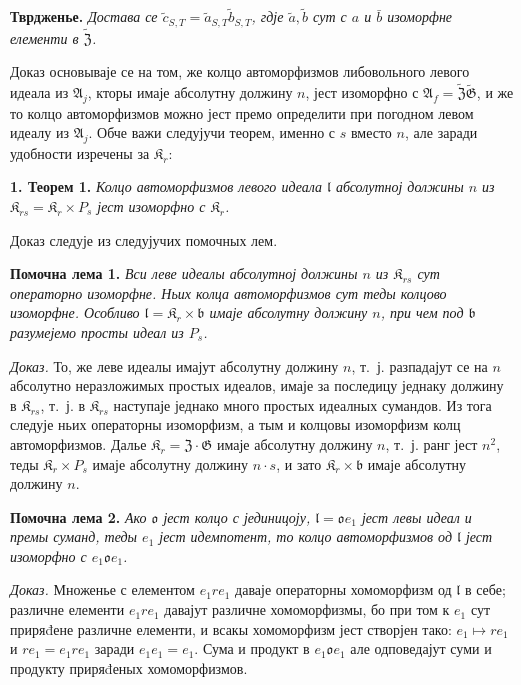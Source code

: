 \documentclass[11pt]{article}
\begin{document}
\noindent\textbf{Тврдженье.} \emph{Достава се \(\tilde c_{S,T}=\tilde a_{S,T}\tilde b_{S,T}\), гдје \(\tilde a,\tilde b\) сут с \(a\) и \(\bar b\) изоморфне елементи в \(\widetilde{\mathfrak Z}\).}

Доказ основываје се на том, же колцо автоморфизмов либовольного левого идеала из \(\mathfrak A_j\), кторы имаје абсолутну должину \(n\), јест изоморфно с \(\mathfrak A_f=\widetilde{\mathfrak Z}\widetilde{\mathfrak G}\), и же то колцо автоморфизмов можно јест премо определити при погодном левом идеалу из \(\mathfrak A_j\). Обче важи следујучи теорем, именно с \(s\) вместо \(n\), але заради удобности изречены за \(\mathfrak K_r\):

\noindent\textbf{1. Теорем 1.} \emph{Колцо автоморфизмов левого идеала \(\mathfrak l\) абсолутној должины \(n\) из \(\mathfrak K_{rs}=\mathfrak K_r\times P_s\) јест изоморфно с \(\mathfrak K_r\).}

Доказ следује из следујучих помочных лем.

\noindent\textbf{Помочна лема 1.} \emph{Вси леве идеалы абсолутној должины \(n\) из \(\mathfrak K_{rs}\) сут операторно изоморфне. Ньих колца автоморфизмов сут теды колцово изоморфне. Особливо \(\mathfrak l=\mathfrak K_r\times\mathfrak b\) имаје абсолутну должину \(n\), при чем под \(\mathfrak b\) разумејемо просты идеал из \(P_s\).}

\noindent\emph{Доказ.} То, же леве идеалы имајут абсолутну должину \(n\), т.~ј. разпадајут се на \(n\) абсолутно неразложимых простых идеалов, имаје за последицу једнаку должину в \(\mathfrak K_{rs}\), т.~ј. в \(\mathfrak K_{rs}\) наступаје једнако много простых идеалных сумандов. Из тога следује ньих операторны изоморфизм, а тым и колцовы изоморфизм колц автоморфизмов. Далье \(\mathfrak K_r=\mathfrak Z\cdot\mathfrak G\) имаје абсолутну должину \(n\), т.~ј. ранг јест \(n^2\), теды \(\mathfrak K_r\times P_s\) имаје абсолутну должину \(n\cdot s\), и зато \(\mathfrak K_r\times\mathfrak b\) имаје абсолутну должину \(n\).

\noindent\textbf{Помочна лема 2.} \emph{Ако \(\mathfrak o\) јест колцо с јединицоју, \(\mathfrak l=\mathfrak o e_1\) јест левы идеал и премы суманд, теды \(e_1\) јест идемпотент, то колцо автоморфизмов од \(\mathfrak l\) јест изоморфно с \(e_1\mathfrak o e_1\).}

\noindent\emph{Доказ.} Множенье с елементом \(e_1re_1\) даваје операторны хомоморфизм од \(\mathfrak l\) в себе; различне елементи \(e_1re_1\) давајут различне хомоморфизмы, бо при том к \(e_1\) сут приряđене различне елементи, и всакы хомоморфизм јест створјен тако: \(e_1\mapsto re_1\) и \(re_1=e_1re_1\) заради \(e_1e_1=e_1\). Сума и продукт в \(e_1\mathfrak o e_1\) але одповедајут суми и продукту приряđеных хомоморфизмов.
\end{document}
